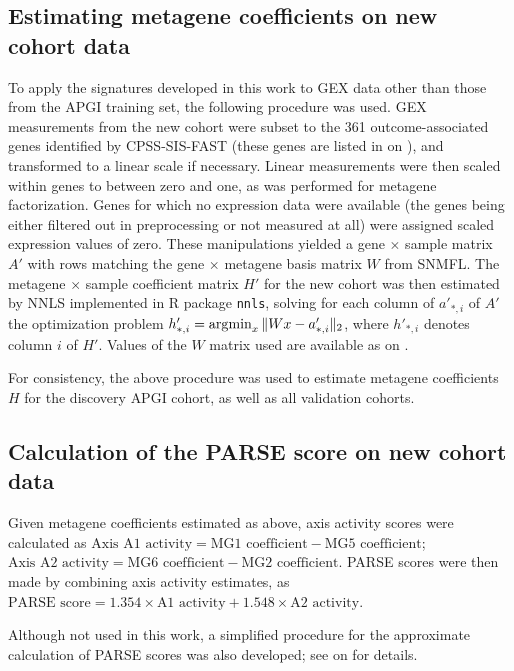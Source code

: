 \documentclass[dissertation.tex]{subfiles}
\begin{document}
\subsection{Estimating metagene coefficients on new cohort data}
To apply the signatures developed in this work to \gls{GEX} data other than those from the \gls{APGI} training set, the following procedure was used.  \Gls{GEX} measurements from the new cohort were subset to the 361 outcome-associated genes identified by \gls{CPSS}-\gls{SIS}-\gls{FAST} (these genes are listed in  on ), and transformed to a linear scale if necessary.  Linear measurements were then scaled within genes to between zero and one, as was performed for metagene factorization.  Genes for which no expression data were available (the genes being either filtered out in preprocessing or not measured at all) were assigned scaled expression values of zero.  These manipulations yielded a gene $\times$ sample matrix $A'$ with rows matching the gene $\times$ metagene basis matrix $W$ from \gls{SNMFL}.  The metagene $\times$ sample coefficient matrix $H'$ for the new cohort was then estimated by \gls{NNLS} implemented in R package \texttt{nnls}, solving for each column of $a'_{*,i}$ of $A'$ the optimization problem ${h'_{*,i}} = \operatorname*{\arg\!\min}_x \| W x - a'_{*,i} \|_2$, where $h'_{*,i}$ denotes column $i$ of $H'$.  Values of the $W$ matrix used are available as  on .

For consistency, the above procedure was used to estimate metagene coefficients $H$ for the discovery \gls{APGI} cohort, as well as all validation cohorts.

\subsection{Calculation of the \acrshort{PARSE} score on new cohort data}
Given metagene coefficients estimated as above, axis activity scores were calculated as $\text{Axis A1 activity} = \text{MG1 coefficient} - \text{MG5 coefficient}$; $\text{Axis A2 activity} = \text{MG6 coefficient} - \text{MG2 coefficient}$.  \gls{PARSE} scores were then made by combining axis activity estimates, as $\text{PARSE score} = 1.354 \times \text{A1 activity} + 1.548 \times \text{A2 activity}$.

Although not used in this work, a simplified procedure for the approximate calculation of \gls{PARSE} scores was also developed; see  on  for details.
\end{document}
